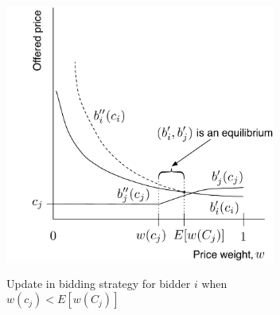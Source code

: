 \begin{figure}[tp!]
	\caption{Update in bidding strategy for bidder $i$ when $w(c_j) < E[w(C_j)]$}
	\includegraphics[width=3.5in]{2/Figures/pincomplete_bids_update_i_2}
	\label{fig:pincomplete_bids_update_i_2}
\end{figure}

